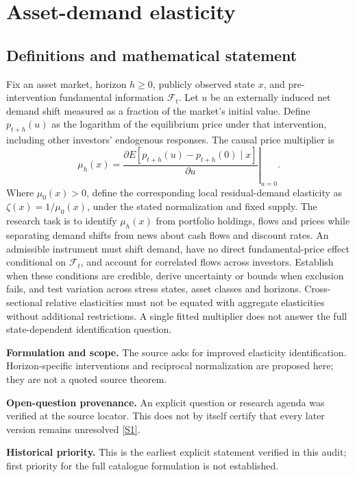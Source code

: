 \documentclass[11pt]{article}
\newcommand{\sref}[2]{\hyperlink{source:#1:#2}{[S#2]}}
\begin{document}
\section*{Asset-demand elasticity}\label{30007594}
\subsection{Definitions and mathematical statement}
Fix an asset market, horizon \(h\geq0\), publicly observed state \(x\), and pre-intervention fundamental information \(\mathcal F_t\). Let \(u\) be an externally induced net demand shift measured as a fraction of the market's initial value. Define \(p_{t+h}(u)\) as the logarithm of the equilibrium price under that intervention, including other investors' endogenous responses. The causal price multiplier is
\[\mu_h(x)=\left.\frac{\partial E[p_{t+h}(u)-p_{t+h}(0)\mid x]}{\partial u}\right|_{u=0}.\]
Where \(\mu_0(x)>0\), define the corresponding local residual-demand elasticity as \(\zeta(x)=1/\mu_0(x)\), under the stated normalization and fixed supply. The research task is to identify \(\mu_h(x)\) from portfolio holdings, flows and prices while separating demand shifts from news about cash flows and discount rates. An admissible instrument must shift demand, have no direct fundamental-price effect conditional on \(\mathcal F_t\), and account for correlated flows across investors. Establish when these conditions are credible, derive uncertainty or bounds when exclusion fails, and test variation across stress states, asset classes and horizons. Cross-sectional relative elasticities must not be equated with aggregate elasticities without additional restrictions. A single fitted multiplier does not answer the full state-dependent identification question.

\par\textbf{Formulation and scope.} The source asks for improved elasticity identification. Horizon-specific interventions and reciprocal normalization are proposed here; they are not a quoted source theorem.

\par\textbf{Open-question provenance.} An explicit question or research agenda was verified at the source locator. This does not by itself certify that every later version remains unresolved \sref{30007594}{1}.

\par\textbf{Historical priority.} This is the earliest explicit statement verified in this audit; first priority for the full catalogue formulation is not established.
\end{document}
